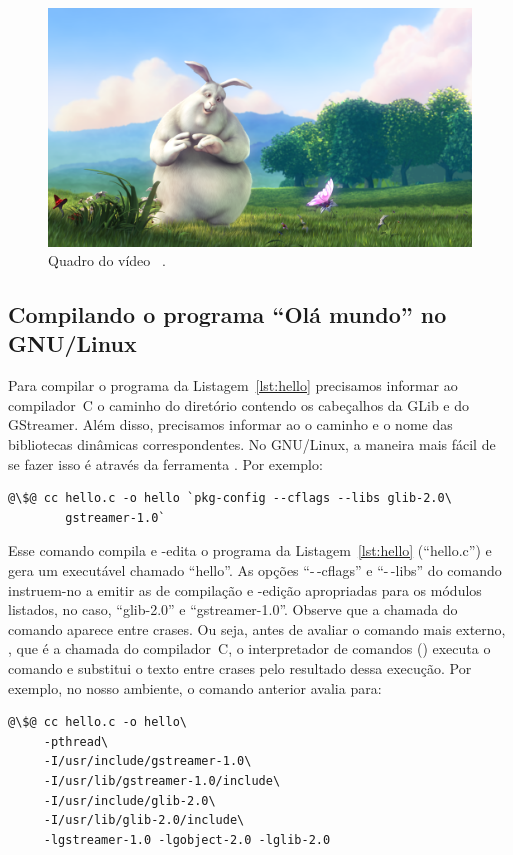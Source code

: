 \documentclass{SBCbookchapter}
\begin{document}
\begin{figure}[H]
  \centering
  \includegraphics[scale=.115]{media/frame}
  \caption{Quadro do vídeo ~\cite{bunny}.}
  \label{fig:bunny}
\end{figure}


\subsection*{Compilando o programa ``Olá mundo'' no GNU/Linux}

Para compilar o programa da Listagem~\ref{lst:hello} precisamos informar ao
compilador~C o caminho do diretório contendo os cabeçalhos da GLib e do
GStreamer.  Além disso, precisamos informar ao  o caminho e o
nome das bibliotecas dinâmicas correspondentes.  No GNU/Linux, a maneira
mais fácil de se fazer isso é através da ferramenta .  Por
exemplo:
\begin{lstlisting}[style=command]
@\$@ cc hello.c -o hello `pkg-config --cflags --libs glib-2.0\
        gstreamer-1.0`
\end{lstlisting}

Esse comando compila e -edita o programa da
Listagem~\ref{lst:hello} (``hello.c'') e gera um executável chamado
``hello''.  As opções ``-\,-cflags'' e ``-\,-libs'' do comando
 instruem-no a emitir as  de compilação e
\en{link}-edição apropriadas para os módulos listados, no caso, ``glib-2.0''
e ``gstreamer-1.0''.  Observe que a chamada do comando \en{pkg-config}
aparece entre crases.  Ou seja, antes de avaliar o comando mais externo,
\en{cc}, que é a chamada do compilador~C, o interpretador de comandos
(\en{shell}) executa o comando \en{pkg-config} e substitui o texto entre
crases pelo resultado dessa execução.  Por exemplo, no nosso ambiente, o
comando anterior avalia para:
\begin{lstlisting}[style=command]
@\$@ cc hello.c -o hello\
     -pthread\
     -I/usr/include/gstreamer-1.0\
     -I/usr/lib/gstreamer-1.0/include\
     -I/usr/include/glib-2.0\
     -I/usr/lib/glib-2.0/include\
     -lgstreamer-1.0 -lgobject-2.0 -lglib-2.0
\end{lstlisting}
\end{document}
